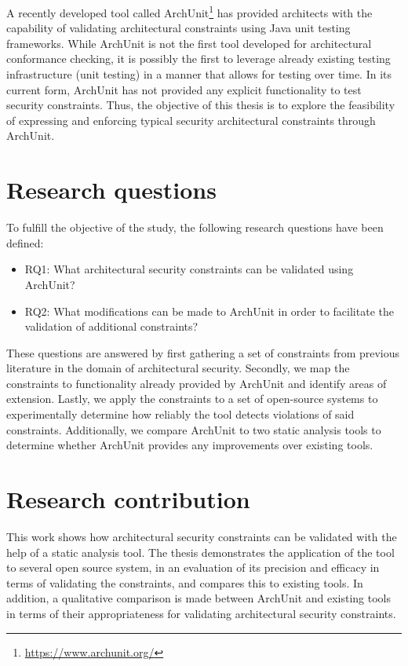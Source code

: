 A recently developed tool called ArchUnit\footnote{\url{https://www.archunit.org/}} has provided architects with the capability of validating architectural constraints using Java unit testing frameworks. While ArchUnit is not the first tool developed for architectural conformance checking, it is possibly the first to leverage already existing testing infrastructure (unit testing) in a manner that allows for testing over time. In its current form, ArchUnit has not provided any explicit functionality to test security constraints. Thus, the objective of this thesis is to explore the feasibility of expressing and enforcing typical security architectural constraints through ArchUnit.

\section{Research questions}
To fulfill the objective of the study, the following research questions have been defined:

\begin{itemize}
    \item RQ1: What architectural security constraints can be validated using ArchUnit?
    \item RQ2: What modifications can be made to ArchUnit in order to facilitate the validation of additional constraints?
\end{itemize}

These questions are answered by first gathering a set of constraints from previous literature in the domain of architectural security. Secondly, we map the constraints to functionality already provided by ArchUnit and identify areas of extension. Lastly, we apply the constraints to a set of open-source systems to experimentally determine how reliably the tool detects violations of said constraints. Additionally, we compare ArchUnit to two static analysis tools to determine whether ArchUnit provides any improvements over existing tools. 

\section{Research contribution}
This work shows how architectural security constraints can be validated with the help of a static analysis tool. The thesis demonstrates the application of the tool to several open source system, in an evaluation of its precision and efficacy in terms of validating the constraints, and compares this to existing tools. In addition, a qualitative comparison is made between ArchUnit and existing tools in terms of their appropriateness for validating architectural security constraints.

